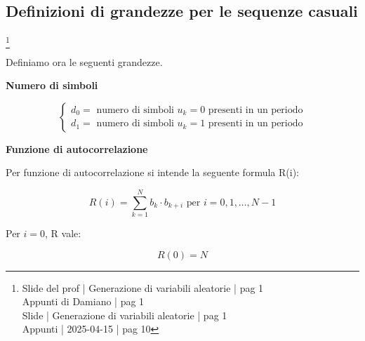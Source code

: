 \newpage 

\subsection{Definizioni di grandezze per le sequenze casuali}
\footnote{Slide del prof | Generazione di variabili aleatorie | pag 1\\ 
Appunti di Damiano | pag 1\\ 
Slide | Generazione di variabili aleatorie | pag  1\\ 
Appunti | 2025-04-15 | pag 10
} 

Definiamo ora le seguenti grandezze. \newline 

\textbf{Numero di simboli}

{
    \Large 
    \begin{equation}
        \begin{cases}
            d_0 = \text{ numero di simboli } u_k = 0 \text{ presenti in un periodo} 
            \\
            d_1 = \text{ numero di simboli } u_k = 1 \text{ presenti in un periodo} 
        \end{cases}
    \end{equation}
}


\textbf{Funzione di autocorrelazione}

Per funzione di autocorrelazione si intende la seguente formula R(i): 

{
    \Large 
    \begin{equation}
        R(i) = \sum_{k = 1}^{N} b_k \cdot b_{k+i} \text{ per } i = 0, 1, \dots, N-1
    \end{equation}
}

Per $i = 0$, R vale: 

{
    \Large 
    \begin{equation}
        R(0) = N
    \end{equation}
}

